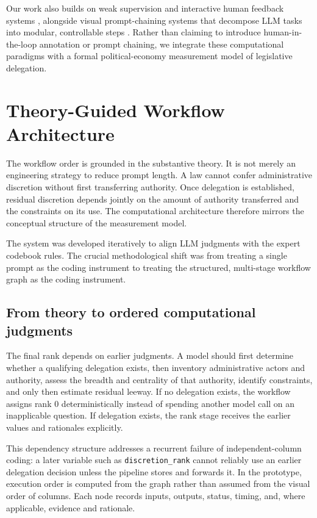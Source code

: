\documentclass[conference]{IEEEtran}
\begin{document}
Our work also builds on weak supervision and interactive human feedback systems \citep{ratner2017snorkel,cormack2014evaluation}, alongside visual prompt-chaining systems that decompose LLM tasks into modular, controllable steps \citep{wu2022aichains,wu2022promptchainer}. Rather than claiming to introduce human-in-the-loop annotation or prompt chaining, we integrate these computational paradigms with a formal political-economy measurement model of legislative delegation.


\section{Theory-Guided Workflow Architecture}

The workflow order is grounded in the substantive theory. It is not merely an engineering strategy to reduce prompt length. A law cannot confer administrative discretion without first transferring authority. Once delegation is established, residual discretion depends jointly on the amount of authority transferred and the constraints on its use. The computational architecture therefore mirrors the conceptual structure of the measurement model.

The system was developed iteratively to align LLM judgments with the expert codebook rules. The crucial methodological shift was from treating a single prompt as the coding instrument to treating the structured, multi-stage workflow graph as the coding instrument.


\subsection{From theory to ordered computational judgments}

The final rank depends on earlier judgments. A model should first determine whether a qualifying delegation exists, then inventory administrative actors and authority, assess the breadth and centrality of that authority, identify constraints, and only then estimate residual leeway. If no delegation exists, the workflow assigns rank 0 deterministically instead of spending another model call on an inapplicable question. If delegation exists, the rank stage receives the earlier values and rationales explicitly.

This dependency structure addresses a recurrent failure of independent-column coding: a later variable such as \texttt{discretion\_rank} cannot reliably use an earlier delegation decision unless the pipeline stores and forwards it. In the prototype, execution order is computed from the graph rather than assumed from the visual order of columns. Each node records inputs, outputs, status, timing, and, where applicable, evidence and rationale.
\end{document}
